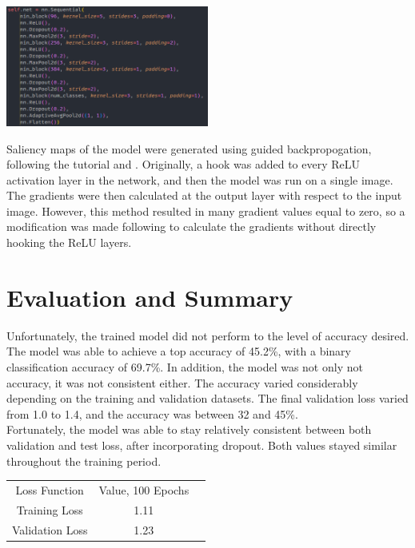 \documentclass{article}[12pt]
\begin{document}
\begin{center}
    \includegraphics[width=0.5\textwidth]{images/model_code.png}
\end{center}

\indent
Saliency maps of the model were generated using guided backpropogation, following the tutorial \cite{saliency} and \cite{backprop}. Originally, a hook was added to every ReLU activation layer in the network, and then the model was run on a single image. The gradients were then calculated at the output layer with respect to the input image. However, this method resulted in many gradient values equal to zero, so a modification was made following \cite{saliency} to calculate the gradients without directly hooking the ReLU layers.\\

\section*{Evaluation and Summary}

Unfortunately, the trained model did not perform to the level of accuracy desired. The model was able to achieve a top accuracy of 45.2\%, with a binary classification accuracy of 69.7\%. In addition, the model was not only not accuracy, it was not consistent either. The accuracy varied considerably depending on the training and validation datasets. The final validation loss varied from 1.0 to 1.4, and the accuracy was between 32 and 45\%.\\
\indent
Fortunately, the model was able to stay relatively consistent between both validation and test loss, after incorporating dropout. Both values stayed similar throughout the training period. \\

\begin{center}
    \begin{tabular}{|c|c|c|}
        Loss Function & Value, 100 Epochs\\
        Training Loss & 1.11 \\
        Validation Loss & 1.23 \\
    \end{tabular}
\end{center}
\end{document}
